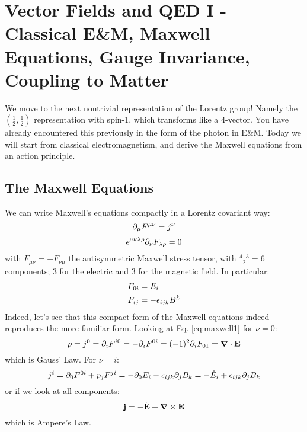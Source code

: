 \section{Vector Fields and QED I - Classical E\&M, Maxwell Equations, Gauge Invariance, Coupling to Matter}

We move to the next nontrivial representation of the Lorentz group! Namely the $(\frac{1}{2}, \frac{1}{2})$ representation with spin-1, which transforms like a 4-vector. You have already encountered this previously in the form of the photon in E\&M. Today we will start from classical electromagnetism, and derive the Maxwell equations from an action principle.

\subsection{The Maxwell Equations}
We can write Maxwell's equations compactly in a Lorentz covariant way:
\begin{equation}\label{eq:maxwell1}
    \partial_\mu F^{\mu\nu} = j^\nu
\end{equation}
\begin{equation}\label{eq:maxwell2}
    \epsilon^{\mu\nu\lambda\rho}\partial_\nu F_{\lambda \rho} = 0
\end{equation}
with $F_{\mu\nu} = -F_{\nu\mu}$ the antisymmetric Maxwell stress tensor, with $\frac{4 \cdot 3}{2} = 6$ components; 3 for the electric and 3 for the magnetic field. In particular:
\begin{equation}
    \begin{split}
        F_{0i} &= E_i
        \\ F_{ij} &= -\epsilon_{ijk}B^k
    \end{split}
\end{equation}
Indeed, let's see that this compact form of the Maxwell equations indeed reproduces the more familiar form. Looking at Eq. \eqref{eq:maxwell1} for $\nu = 0$:
\begin{equation}
    \rho = j^0 = \p_i F^{i0} = -\p_i F^{0i} = (-1)^2 \p_i F_{01} = \nabla \cdot \v{E}
\end{equation}
which is Gauss' Law. For $\nu = i$:
\begin{equation}
    j^i = \partial_0 F^{0i} + p_j F^{ji} = -\partial_0 E_i - \epsilon_{ijk}\partial_j B_k = -\dot{E}_i + \epsilon_{ijk}\partial_j B_k
\end{equation}
or if we look at all components:
\begin{equation}
    \v{j} = -\dot{\v{E}} + \nabla \times \v{E}
\end{equation}
which is Ampere's Law.

